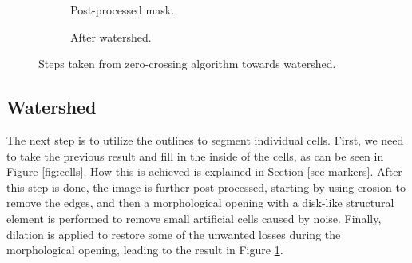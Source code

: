 \documentclass[
  digital,     %
  oneside,     %
  nosansbold,  %
  nocolorbold, %
  lof,         %
  lot,         %
]{fithesis4}
\begin{document}
\begin{figure}
\begin{subfigure}[t]{0.45\textwidth}
        \caption{Post-processed mask.}
        \label{fig:cells-post-processed}
    \end{subfigure}
    \begin{subfigure}[t]{0.45\textwidth}
        \caption{After watershed.}
        \label{fig:watershed}
    \end{subfigure}
    \caption{Steps taken from zero-crossing algorithm towards watershed.}
    \label{fig:zc-watershed}
\end{figure}

\subsection{Watershed}
The next step is to utilize the outlines to segment individual cells. First, we need
to take the previous result and fill in the inside of the cells, as can be seen
in Figure \ref{fig:cells}. How this is achieved is explained in Section
\ref{sec-markers}. After this step is done, the image is further post-processed,
starting by using erosion to remove the edges, and then a morphological opening with
a disk-like structural element is performed to remove small artificial cells caused
by noise. Finally, dilation is applied to restore some of the unwanted losses
during the morphological opening, leading to the result in Figure 
\ref{fig:cells-post-processed}.
\end{document}

